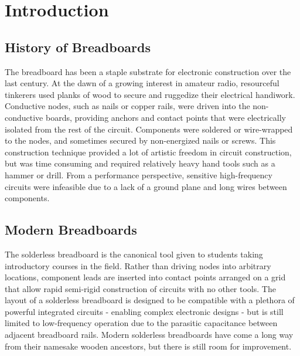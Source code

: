 \chapter{Introduction}

\section{History of Breadboards}

The breadboard has been a staple substrate for electronic construction over the last century.
At the dawn of a growing interest in amateur radio, resourceful tinkerers used planks of wood to secure and ruggedize their electrical handiwork.
Conductive nodes, such as nails or copper rails, were driven into the non-conductive boards, providing anchors and contact points that were electrically isolated from the rest of the circuit.
Components were soldered or wire-wrapped to the nodes, and sometimes secured by non-energized nails or screws.
This construction technique provided a lot of artistic freedom in circuit construction, but was time consuming and required relatively heavy hand tools such as a hammer or drill.
From a performance perspective, sensitive high-frequency circuits were infeasible due to a lack of a ground plane and long wires between components.


\section{Modern Breadboards}

The solderless breadboard is the canonical tool given to students taking introductory courses in the field.
Rather than driving nodes into arbitrary locations, component leads are inserted into contact points arranged on a grid that allow rapid semi-rigid construction of circuits with no other tools.
The layout of a solderless breadboard is designed to be compatible with a plethora of powerful integrated circuits - enabling complex electronic designs - but is still limited to low-frequency operation due to the parasitic capacitance between adjacent breadboard rails.
Modern solderless breadboards have come a long way from their namesake wooden ancestors, but there is still room for improvement.

